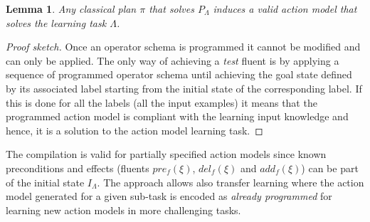 \documentclass[letterpaper]{article} %
\newtheorem{lemma}[theorem]{Lemma}
\begin{document}
\begin{lemma}
Any classical plan $\pi$ that solves $P_{\Lambda}$ induces a valid action model that solves the learning task $\Lambda$.
\end{lemma}

\begin{proof}[Proof sketch]
Once an operator schema is programmed it cannot be modified and can only be applied. The only way of achieving a {\em test} fluent is by applying a sequence of programmed operator schema until achieving the goal state defined by its associated label starting from the initial state of the corresponding label. If this is done for all the labels (all the input examples) it means that the programmed action model is compliant with the learning input knowledge and hence, it is a solution to the action model learning task.
\end{proof}

The compilation is valid for partially specified action models since known preconditions and effects (fluents $pre_f(\xi)$, $del_f(\xi)$ and $add_f(\xi)$) can be part of the initial state $I_{\Lambda}$. The approach allows also transfer learning where the action model generated for a given sub-task is encoded as {\em already programmed} for learning new action models in more challenging tasks.
\end{document}
